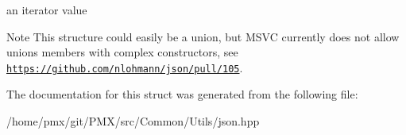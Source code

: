 an iterator value 

\begin{DoxyNote}{Note}
This structure could easily be a union, but M\+S\+VC currently does not allow unions members with complex constructors, see \href{https://github.com/nlohmann/json/pull/105}{\tt https\+://github.\+com/nlohmann/json/pull/105}. 
\end{DoxyNote}


The documentation for this struct was generated from the following file\+:\begin{DoxyCompactItemize}
\item 
/home/pmx/git/\+P\+M\+X/src/\+Common/\+Utils/json.\+hpp\end{DoxyCompactItemize}
